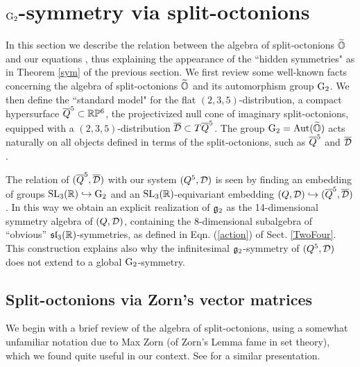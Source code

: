 
\section{${\rm G}_2$-symmetry via split-octonions} \label{Three}In this section we describe  the relation between  the algebra of split-octonions $\widetilde{\mathbb O}$ and our equations \eqnsss, thus  explaining  the appearance of the ``hidden symmetries" as in Theorem \ref{sym} of the previous section.  We first review  some well-known facts concerning the algebra of split-octonions $\widetilde{\mathbb O}$ and its  automorphism group ${\rm G}_2$.  We then  define the ``standard model"   for the flat   $(2,3,5)$-distribution, 
a compact hypersurface   $\overline{Q}^5\subset \mathbb{R}\mathbb{P}^6$,  the projectivized null cone of imaginary split-octonions,  equipped with a $(2,3,5)$-distribution $\overline{\mathcal D}\subset T\overline{Q}^5$. The group  ${\rm G}_2={\rm Aut}(\widetilde{\mathbb O})$  acts naturally on all objects defined in terms  of  the split-octonions, such as $\overline{Q}^5$ and $\overline{\mathcal D}$. 

The relation of $(\overline{Q}^5,\overline{\mathcal D})$ with our system $(Q^5,{\mathcal D})$ is seen by finding an  embedding of groups ${\mathrm{SL}_3(\mathbb{R})}\hookrightarrow {\rm G}_2$ and an  ${\mathrm{SL}_3(\mathbb{R})}$-equivariant embedding  $(Q, {\mathcal D})\hookrightarrow (\overline{Q}^5, \overline{\mathcal D})$. In this way we obtain  an  explicit realization of ${\mathfrak{g}}_2$ as   the 14-dimensional symmetry algebra of $(Q,{\mathcal D})$, containing the 8-dimensional subalgebra of ``obvious'' $\mathfrak{sl}_3(\mathbb{R})$-symmetries, as defined in  Eqn. (\ref{action})  of Sect. \ref{TwoFour}.  This  construction  explains  also why the infinitesimal ${\mathfrak{g}}_2$-symmetry of $(Q^5, {\mathcal D})$ does not extend to a global ${\rm G}_2$-symmetry. 






\subsection{Split-octonions via Zorn's vector matrices}
We begin with a brief review of the algebra of split-octonions, using a somewhat unfamiliar notation due to Max Zorn (of Zorn's Lemma fame in set theory), which we found quite useful in our context. See \cite{Katja} for a similar presentation. 


